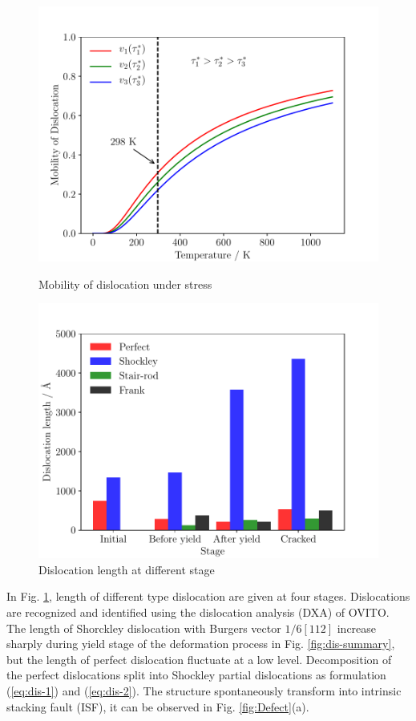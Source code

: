 \documentclass[metals,article,submit,moreauthors,pdftex,10pt,a4paper]{Definitions/mdpi}
\begin{document}
\begin{figure}[ht]
	\centering
	\begin{minipage}{0.495\textwidth}
		\includegraphics[width=1\linewidth]{img/temp}
		\centering
		\caption{Mobility of dislocation under stress}
		\label{fig:temp}
	\end{minipage}	
	\hfill
	\begin{minipage}{0.495\textwidth}		
		\includegraphics[width=1\linewidth]{img/dis-summary}
		\centering
		\caption{Dislocation length at different stage }
		\label{fig:disum}
	\end{minipage}
\end{figure}


In Fig. \ref{fig:disum}, length of different type dislocation are given at four stages. Dislocations are recognized and identified using the dislocation analysis (DXA) of OVITO. The length of Shorckley dislocation with Burgers vector $1/6[1 1 2]$ increase sharply during yield stage of the deformation process in Fig. \ref{fig:dis-summary}, but the length of perfect dislocation fluctuate at a low level. Decomposition of the perfect  dislocations split into Shockley partial dislocations as formulation (\ref{eq:dis-1}) and (\ref{eq:dis-2}). The structure spontaneously transform into intrinsic stacking fault (ISF), it can be observed in Fig. \ref{fig:Defect}(a). 
\end{document}
